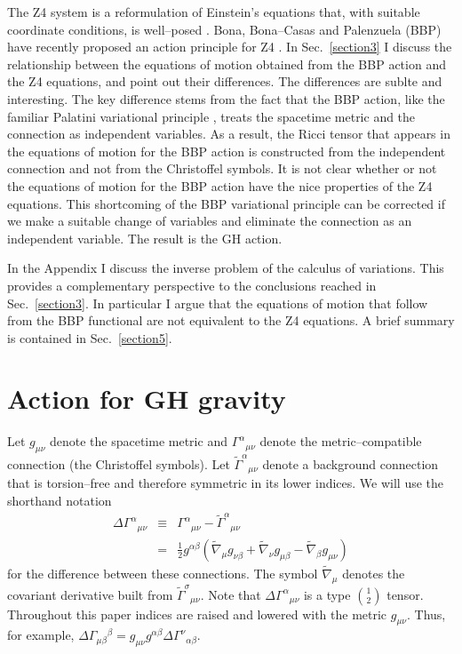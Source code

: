 \documentclass[letterpaper,nofootinbib,prd,amsmath,twocolumn]{revtex4-1}
\begin{document}
The Z4 system is a reformulation of Einstein's equations that, with suitable coordinate conditions, is 
well--posed \cite{Bona:2003fj,Bona:2003qn}. Bona, Bona--Casas and Palenzuela (BBP) have recently proposed an 
action principle for Z4 \cite{Bona:2010is}. In 
Sec.~\ref{section3} I discuss the relationship between the equations of motion obtained from the BBP action 
and the Z4 equations, and point out their differences. The differences are sublte and interesting. The key difference stems from the fact that the BBP 
action, like the familiar Palatini variational principle \cite{Misner:1974qy}, 
treats the spacetime metric and the connection as independent variables. As a result, the Ricci tensor that 
appears in the equations of motion for the BBP action is constructed from the independent connection and not from the 
Christoffel symbols. It is not clear whether or not the equations of motion for the BBP action  have the nice properties 
of the Z4 equations. This shortcoming 
of the BBP variational principle can be corrected if we make a suitable change of variables and 
eliminate the connection as an independent variable. The result is the GH action. 

In the Appendix I discuss the inverse problem of the calculus of variations. This provides a 
complementary perspective to the conclusions reached in Sec.~\ref{section3}. In particular I argue that the 
equations of motion that follow from the BBP functional are not equivalent to the Z4 equations. A brief summary  
is contained in Sec.~\ref{section5}. 

\section{Action for GH gravity}\label{section2}
Let $g_{\mu\nu}$ denote the spacetime metric and $\Gamma^\alpha{}_{\mu\nu}$ denote the 
metric--compatible connection (the Christoffel symbols). Let $\tilde\Gamma^\alpha{}_{\mu\nu}$ 
denote a background connection that is torsion--free and therefore symmetric in its lower indices. 
We will use the shorthand notation 
\begin{eqnarray}\label{DelGammaDef}
	\Delta\Gamma^\alpha{}_{\mu\nu} & \equiv & \Gamma^\alpha{}_{\mu\nu} - \tilde\Gamma^\alpha{}_{\mu\nu}
	\nonumber\\
	& = & \frac{1}{2} g^{\alpha\beta} \left( \tilde\nabla_\mu g_{\nu\beta} + \tilde\nabla_\nu g_{\mu\beta} 
		- \tilde\nabla_\beta g_{\mu\nu} \right) 
\end{eqnarray}
for the difference between these connections. 
The symbol $\tilde\nabla_\mu$ denotes the covariant 
derivative built from $\tilde\Gamma^\sigma{}_{\mu\nu}$. Note that $\Delta\Gamma^\alpha{}_{\mu\nu}$ 
is a type $1\choose 2$ tensor. Throughout this paper indices are raised and lowered with the metric $g_{\mu\nu}$. Thus, 
for example, $\Delta\Gamma_{\mu\beta}{}^\beta = g_{\mu\nu} g^{\alpha\beta} \Delta\Gamma^\nu{}_{\alpha\beta}$. 
\end{document}
